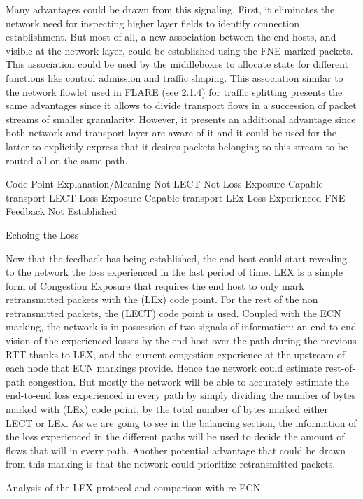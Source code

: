 Many advantages could be drawn from this signaling. First, it eliminates the network need for inspecting higher layer fields to identify connection establishment. But most of all, a new  association between the end hosts, and visible at the network layer, could be established using the FNE-marked packets. This association could be used by the middleboxes to allocate state for different functions like control admission and traffic shaping. This association similar to the network flowlet used in FLARE (see 2.1.4) for traffic splitting presents the same advantages since it allows to divide transport flows in a succession of packet streams of smaller granularity. However, it presents an additional advantage since both network and transport layer are aware of it and it could be used for the latter to explicitly express that it desires packets belonging to this stream to be routed all on the same path.

Code Point
Explanation/Meaning
Not-LECT
Not Loss Exposure Capable transport
LECT
Loss Exposure Capable transport
LEx
Loss Experienced
FNE
Feedback Not Established

Echoing the Loss

Now that the feedback has being established, the end host could start revealing to the network the loss experienced in the last period of time. LEX is a simple form of Congestion Exposure that requires the end host to only mark retransmitted packets with the (LEx) code point. For the rest of the non retransmitted packets, the (LECT) code point is used. Coupled with the ECN marking, the network is in possession of two signals of information: an end-to-end vision of the experienced losses by the end host over the path during the previous RTT thanks to LEX, and the  current congestion experience at the upstream of each node that ECN markings provide. Hence the network could estimate rest-of-path congestion. But mostly the network will be able to accurately estimate the end-to-end loss experienced in every path by simply dividing the number of bytes marked with (LEx) code point,  by the total number of bytes marked either LECT or LEx. As we are going to see in the balancing section, the information of the loss experienced in the different paths will be used to decide the amount of flows that will in every path. Another potential advantage that could be drawn from this marking is that the network could prioritize retransmitted packets.

Analysis of the LEX protocol and comparison with re-ECN

